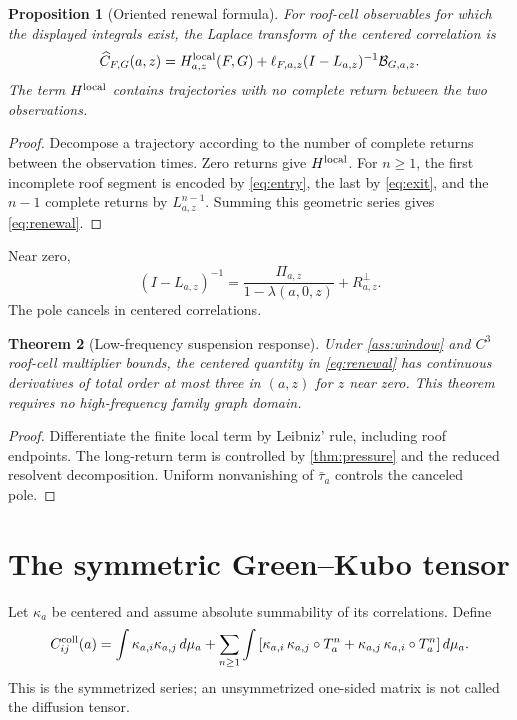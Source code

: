 \documentclass[11pt,reqno]{amsart}
\newtheorem{theorem}{Theorem}[section]
\newtheorem{proposition}[theorem]{Proposition}
\theoremstyle{definition}
\theoremstyle{remark}
\newcommand{\Piop}{\Pi}
\begin{document}
\begin{proposition}[Oriented renewal formula]\label{prop:renewal}
For roof-cell observables for which the displayed integrals exist, the Laplace
transform of the centered correlation is
\begin{equation}\label{eq:renewal}
 \widehat C_{F,G}(a,z)
 =H_{a,z}^{\rm local}(F,G)
 +\ell_{F,a,z}(I-L_{a,z})^{-1}\mathcal B_{G,a,z}.
\end{equation}
The term $H^{\rm local}$ contains trajectories with no complete return between
the two observations.
\end{proposition}

\begin{proof}
Decompose a trajectory according to the number of complete returns between
the observation times.  Zero returns give $H^{\rm local}$.  For $n\ge1$, the
first incomplete roof segment is encoded by \eqref{eq:entry}, the last by
\eqref{eq:exit}, and the $n-1$ complete returns by $L_{a,z}^{n-1}$.  Summing
this geometric series gives \eqref{eq:renewal}.
\end{proof}

Near zero,
\[
 (I-L_{a,z})^{-1}
 =\frac{\Piop_{a,z}}{1-\lambda(a,0,z)}+R_{a,z}^{\perp}.
\]
The pole cancels in centered correlations.

\begin{theorem}[Low-frequency suspension response]\label{thm:lowfreq}
Under \cref{ass:window} and $C^3$ roof-cell multiplier bounds, the centered
quantity in \eqref{eq:renewal} has continuous derivatives of total order at
most three in $(a,z)$ for $z$ near zero.  This theorem requires no
high-frequency family graph domain.
\end{theorem}

\begin{proof}
Differentiate the finite local term by Leibniz' rule, including roof endpoints.
The long-return term is controlled by \cref{thm:pressure} and the reduced
resolvent decomposition.  Uniform nonvanishing of $\bar\tau_a$ controls the
canceled pole.
\end{proof}

\section{The symmetric Green--Kubo tensor}\label{sec:GK}

Let $\kappa_a$ be centered and assume absolute summability of its correlations.
Define
\begin{equation}\label{eq:GK}
 C_{ij}^{\rm coll}(a)
 =\int\kappa_{a,i}\kappa_{a,j}\,d\mu_a
 +\sum_{n\ge1}\int\left[
 \kappa_{a,i}\,\kappa_{a,j}\circ T_a^n
 +\kappa_{a,j}\,\kappa_{a,i}\circ T_a^n
 \right]d\mu_a.
\end{equation}
This is the symmetrized series; an unsymmetrized one-sided matrix is not called
the diffusion tensor.
\end{document}

